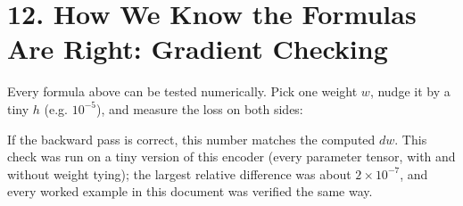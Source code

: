 \documentclass[11pt,a4paper,oneside]{report}
\begin{document}
\section{12. How We Know the Formulas Are Right: Gradient Checking}\label{12-how-we-know-the-formulas-are-right-gradient-checking}

Every formula above can be tested numerically. Pick one weight \(w\), nudge it by a tiny \(h\) (e.g. \(10^{-5}\)), and measure the loss on both sides:

\begin{center}\end{center}

If the backward pass is correct, this number matches the computed \(dw\). This check was run on a tiny version of this encoder (every parameter tensor, with and without weight tying); the largest relative difference was about \(2 \times 10^{-7}\), and every worked example in this document was verified the same way.
\end{document}
